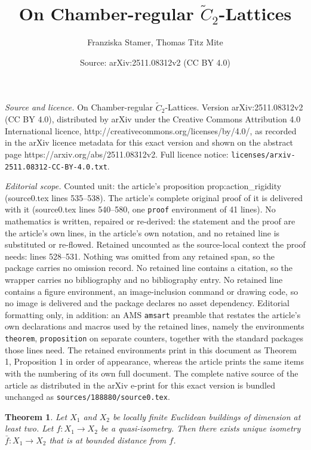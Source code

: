 \documentclass[10pt,a4paper]{amsart}
\title{On Chamber-regular $\tilde C_2$-Lattices}
\author{Franziska Stamer, Thomas Titz Mite}
\date{Source: arXiv:2511.08312v2 (CC BY 4.0)}
\newtheorem{theorem}{Theorem}
\begin{document}
\maketitle

\noindent\emph{Source and licence.} On Chamber-regular $\tilde C_2$-Lattices. Version arXiv:2511.08312v2 (CC BY 4.0), distributed by arXiv under the Creative Commons Attribution 4.0 International licence, http://creativecommons.org/licenses/by/4.0/, as recorded in the arXiv licence metadata for this exact version and shown on the abstract page https://arxiv.org/abs/2511.08312v2. Full licence notice: \texttt{licenses/arxiv-2511.08312-CC-BY-4.0.txt}.\par\smallskip

\noindent\textit{Editorial scope.} Counted unit: the article's proposition prop:action\_rigidity (source0.tex lines 535--538). The article's complete original proof of it is delivered with it (source0.tex lines 540--580, one \texttt{proof} environment of 41 lines). No mathematics is written, repaired or re-derived: the statement and the proof are the article's own lines, in the article's own notation, and no retained line is substituted or re-flowed.  Retained uncounted as the source-local context the proof needs: lines 528--531.  Nothing was omitted from any retained span, so the package carries no omission record.  No retained line contains a citation, so the wrapper carries no bibliography and no bibliography entry.  No retained line contains a figure environment, an image-inclusion command or drawing code, so no image is delivered and the package declares no asset dependency.  Editorial formatting only, in addition: an AMS \texttt{amsart} preamble that restates the article's own declarations and macros used by the retained lines, namely the environments \texttt{theorem}, \texttt{proposition} on separate counters, together with the standard packages those lines need.  The retained environments print in this document as Theorem 1, Proposition 1 in order of appearance, whereas the article prints the same items with the numbering of its own full document.  The complete native source of the article as distributed in the arXiv e-print for this exact version is bundled unchanged as \texttt{sources/188880/source0.tex}.
    \begin{theorem}\label{thm:qi_rigidity}
        Let $X_1$ and $X_2$ be locally finite Euclidean buildings of dimension at least two. Let $f : X_1 \to X_2$ be a quasi-isometry. Then there
        exists unique isometry $\bar f:X_1 \to X_2$ that is at bounded distance from $f$.
    \end{theorem}
\end{document}
